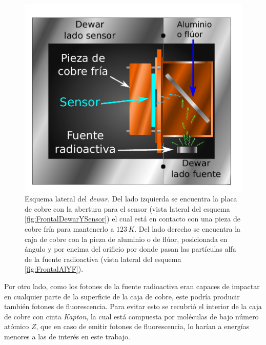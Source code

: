 \begin{figure}%
    \centering
    \includegraphics[scale=0.7]{Figs/LateralDewar.pdf}
    \caption{Esquema lateral del \textit{dewar}. Del lado izquierda se encuentra la placa de cobre con la abertura para el sensor (vista lateral del esquema \ref{fig:FrontalDewarYSensor}) el cual está en contacto con una pieza de cobre fría para mantenerlo a $123\,\si{K}$. Del lado derecho se encuentra la caja de cobre con la pieza de aluminio o de flúor, posicionada en ángulo y por encima del orificio por donde pasan las partículas alfa de la fuente radioactiva (vista lateral del esquema \ref{fig:FrontalAlYF}).}
    \label{fig:LateralDewar}
\end{figure}
Por otro lado, como los fotones de la fuente radioactiva eran capaces de impactar en cualquier parte de la superficie de la caja de cobre, este podría producir también fotones de fluorescencia. Para evitar esto se recubrió el interior de la caja de cobre con cinta \textit{Kapton}, la cual está compuesta por moléculas de bajo número atómico $Z$, que en caso de emitir fotones de fluorescencia, lo harían a energías menores a las de interés en este trabajo.


